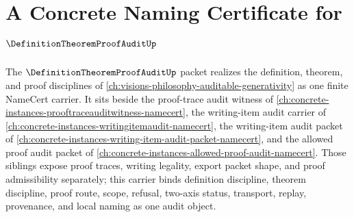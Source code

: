 \chapter{A Concrete Naming Certificate for $\DefinitionTheoremProofAuditUp$}
\label{ch:concrete-instances-definition-theorem-proof-audit-namecert}

The $\DefinitionTheoremProofAuditUp$ packet realizes the definition, theorem, and proof disciplines of \autoref{ch:visions-philosophy-auditable-generativity} as one finite NameCert carrier. It sits beside the proof-trace audit witness of \autoref{ch:concrete-instances-prooftraceauditwitness-namecert}, the writing-item audit carrier of \autoref{ch:concrete-instances-writingitemaudit-namecert}, the writing-item audit packet of \autoref{ch:concrete-instances-writing-item-audit-packet-namecert}, and the allowed proof audit packet of \autoref{ch:concrete-instances-allowed-proof-audit-namecert}. Those siblings expose proof traces, writing legality, export packet shape, and proof admissibility separately; this carrier binds definition discipline, theorem discipline, proof route, scope, refusal, two-axis status, transport, replay, provenance, and local naming as one audit object.

